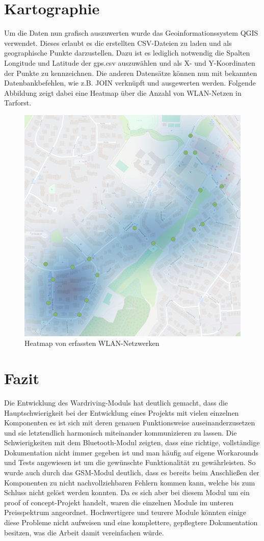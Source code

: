 \documentclass[a4paper,11pt, ngerman]{scrartcl}
\begin{document}
\section{Kartographie}
Um die Daten nun grafisch auszuwerten wurde das Geoinformationssystem \grqq QGIS\grqq{} verwendet. Dieses erlaubt es die erstellten CSV-Dateien zu laden und als geographische Punkte darzustellen. Dazu ist es lediglich notwendig die Spalten \grqq Longitude\grqq{} und \grqq Latitude\grqq{} der gps.csv auszuwählen und als X- und Y-Koordinaten der Punkte zu kennzeichnen. Die anderen Datensätze können nun mit bekannten Datenbankbefehlen, wie z.B. JOIN verknüpft und ausgewerten werden. Folgende Abbildung zeigt dabei eine Heatmap über die Anzahl von WLAN-Netzen in Tarforst.

\begin{figure}[H]
\begin{center}
	\includegraphics[width=.7\linewidth]{map.png}\caption{Heatmap von erfassten WLAN-Netzwerken}
	\end{center}
\end{figure}
\section{Fazit}
Die Entwicklung des Wardriving-Moduls hat deutlich gemacht, dass die Hauptschwierigkeit bei der Entwicklung eines Projekts mit vielen einzelnen Komponenten es ist sich mit deren genauen Funktionsweise auseinanderzusetzen und sie letztendlich harmonisch miteinander kommunizieren zu lassen. Die Schwierigkeiten mit dem Bluetooth-Modul zeigten, dass eine richtige, vollständige Dokumentation nicht immer gegeben ist und man häufig auf eigene Workarounds und Tests angewiesen ist um die gewünschte Funktionalität zu gewährleisten. 
So wurde auch durch das GSM-Modul deutlich, dass es bereits beim Anschließen der Komponenten zu nicht nachvollziehbaren Fehlern kommen kann, welche bis zum Schluss nicht gelöst werden konnten. Da es sich aber bei diesem Modul um ein \grqq proof of concept\grqq{}-Projekt handelt, waren die einzelnen Module im unteren Preisspektrum angeordnet. Hochwertigere und teurere Module könnten einige diese Probleme nicht aufweisen und eine komplettere, gepflegtere Dokumentation besitzen, was die Arbeit damit vereinfachen würde.
\end{document}
